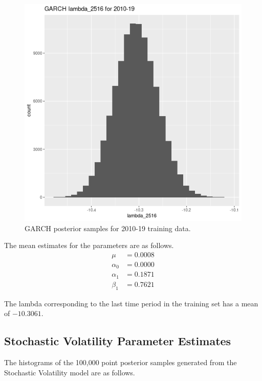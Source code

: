 \documentclass[12pt,letterpaper,reqno,fleqn]{article}
\begin{document}
\begin{figure}
\includegraphics[scale = .4]{glT1019}
\caption{GARCH posterior samples for 2010-19 training data.}
\end{figure}

The mean estimates for the parameters are as follows.
\begin{align*}
\mu &= 0.0008 \\ 
\alpha_0 &= 0.0000 \\ 
\alpha_1 &= 0.1871 \\ 
\beta_1 &= 0.7621 
\end{align*}

The lambda corresponding to the last time period in the training set has a mean of $-10.3061$.

\subsection{Stochastic Volatility Parameter Estimates}
The histograms of the 100,000 point posterior samples generated from the Stochastic Volatility model are as follows.
\end{document}
